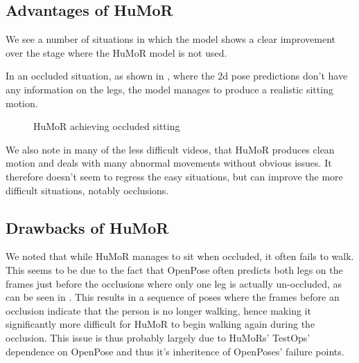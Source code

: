 \subsection{Advantages of HuMoR}
We see a number of situations in which the model shows a clear improvement over the stage where the HuMoR model is not used.

In an occluded situation, as shown in , where the 2d pose predictions don't have any information on the legs, the model manages to produce a realistic sitting motion.

\begin{figure}[h!]
    \centering
    \hfil
    \hfil
    \caption{HuMoR achieving occluded sitting}
    \label{fig:humor_sitting}
\end{figure}

We also note in many of the less difficult videos, that HuMoR produces clean motion and deals with many abnormal movements without obvious issues. It therefore doesn't seem to regress the easy situations, but can improve the more difficult situations, notably occlusions.


\subsection{Drawbacks of HuMoR}

We noted that while HuMoR manages to sit when occluded, it often fails to walk. This seems to be due to the fact that OpenPose often predicts both legs on the frames just before the occlusions where only one leg is actually un-occluded, as can be seen in . This results in a sequence of poses where the frames before an occlusion indicate that the person is no longer walking, hence making it significantly more difficult for HuMoR to begin walking again during the occlusion. This issue is thus probably largely due to HuMoRs' TestOps' dependence on OpenPose and thus it's inheritence of OpenPoses' failure points.

